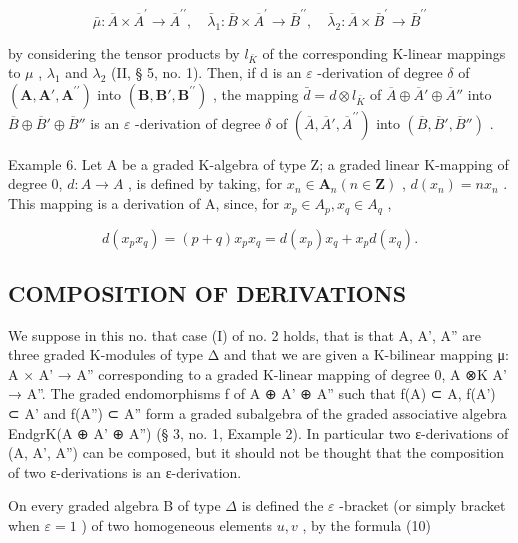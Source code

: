 \[
\bar {\mu}: \overline {{{A}}} \times \overline {{{A}}} ^ {\prime} \rightarrow \overline {{{A}}} ^ {\prime \prime}, \quad \bar {\lambda} _ {1}: \bar {B} \times \overline {{{A}}} ^ {\prime} \rightarrow \bar {B} ^ {\prime \prime}, \quad \bar {\lambda} _ {2}: \overline {{{A}}} \times \bar {B} ^ {\prime} \rightarrow \bar {B} ^ {\prime \prime}
\]

by considering the tensor products by \(l_{\bar{K}}\) of the corresponding K-linear mappings to \(\mu\) , \(\lambda_{1}\) and \(\lambda_{2}\) (II, § 5, no. 1). Then, if d is an \(\varepsilon\) -derivation of degree \(\delta\) of \((\mathbf{A}, \mathbf{A}', \mathbf{A}^{\prime\prime})\) into \((\mathbf{B}, \mathbf{B}', \mathbf{B}^{\prime\prime})\) , the mapping \(\bar{d} = d \otimes l_{\bar{K}}\) of \(\overline{A} \oplus \overline{A}' \oplus \overline{A}''\) into \(\overline{B} \oplus \overline{B}' \oplus \overline{B}''\) is an \(\varepsilon\) -derivation of degree \(\delta\) of \((\overline{A}, \overline{A}', \overline{A}^{\prime\prime})\) into \((\overline{B}, \overline{B}', \overline{B}'' )\) .

Example 6. Let A be a graded K-algebra of type Z; a graded linear K-mapping of degree 0, \(d: A \to A\) , is defined by taking, for \(x_{n} \in \mathbf{A}_{n}(n \in \mathbf{Z})\) , \(d(x_{n}) = nx_{n}\) . This mapping is a derivation of A, since, for \(x_{p} \in A_{p}, x_{q} \in A_{q}\) ,

\[
d (x _ {p} x _ {q}) = (p + q) x _ {p} x _ {q} = d (x _ {p}) x _ {q} + x _ {p} d (x _ {q}).
\]

\subsection{COMPOSITION OF DERIVATIONS}

We suppose in this no. that case (I) of no. 2 holds, that is that A, A', A'' are three graded K-modules of type Δ and that we are given a K-bilinear mapping μ: A × A' → A'' corresponding to a graded K-linear mapping of degree 0, A ⊗K A' → A''. The graded endomorphisms f of A ⊕ A' ⊕ A'' such that f(A) ⊂ A, f(A') ⊂ A' and f(A'') ⊂ A'' form a graded subalgebra of the graded associative algebra EndgrK(A ⊕ A' ⊕ A'') (§ 3, no. 1, Example 2). In particular two ε-derivations of (A, A', A'') can be composed, but it should not be thought that the composition of two ε-derivations is an ε-derivation.

On every graded algebra B of type \(\Delta\) is defined the \(\varepsilon\) -bracket (or simply bracket when \(\varepsilon = 1\) ) of two homogeneous elements \(u, v\) , by the formula (10)

